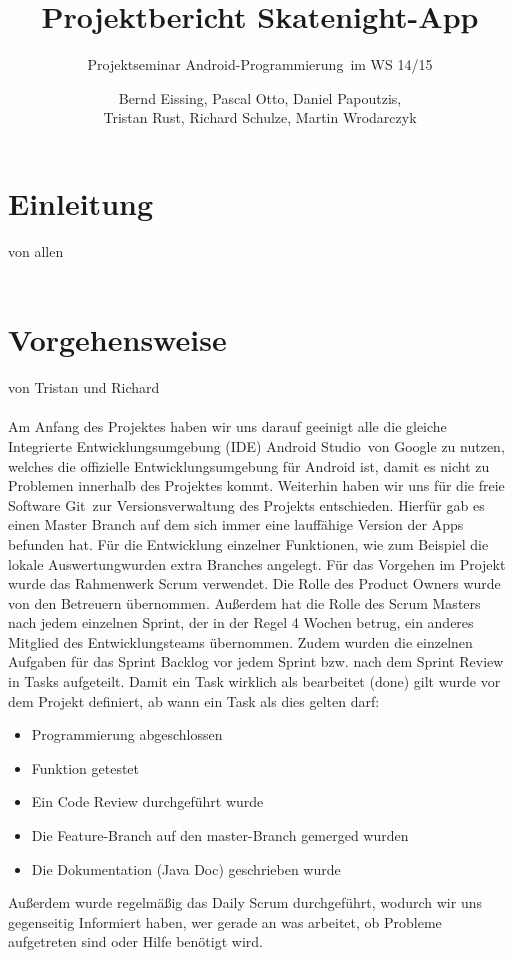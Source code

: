 \documentclass[a4paper, titlepage]{scrartcl}
\title{Projektbericht Skatenight-App}
\subtitle{Projektseminar \glqq Android-Programmierung\grqq\ im WS 14/15}
\author{Bernd Eissing, Pascal Otto, Daniel Papoutzis,\\Tristan Rust, Richard Schulze, Martin Wrodarczyk}
\date{}
\newcommand{\AUTHOR}[1]{
	von #1 \\ \\
}
\begin{document}
\maketitle

\tableofcontents
\newpage

\section{Einleitung}
\AUTHOR{allen}



\section{Vorgehensweise}
\AUTHOR{Tristan und Richard}
Am Anfang des Projektes haben wir uns darauf geeinigt alle die gleiche Integrierte Entwicklungsumgebung (IDE) \glqq Android Studio\grqq\ von Google zu nutzen, welches die offizielle Entwicklungsumgebung für Android ist, damit es nicht zu Problemen innerhalb des Projektes kommt.
Weiterhin haben wir uns für die freie Software \glqq Git\grqq\ zur Versionsverwaltung des Projekts entschieden. Hierfür gab es einen Master Branch auf dem sich immer eine lauffähige Version der Apps befunden hat. Für die Entwicklung einzelner Funktionen, wie zum Beispiel die \glqq lokale Auswertung\grqq wurden extra Branches angelegt.
Für das Vorgehen im Projekt wurde das Rahmenwerk Scrum verwendet. Die Rolle des Product Owners wurde von den Betreuern übernommen. Außerdem hat die Rolle des Scrum Masters nach jedem einzelnen Sprint, der in der Regel 4 Wochen betrug, ein anderes Mitglied des Entwicklungsteams übernommen. Zudem wurden die einzelnen Aufgaben für das Sprint Backlog vor jedem Sprint bzw. nach dem Sprint Review in Tasks aufgeteilt. Damit ein Task wirklich als bearbeitet (\glqq done\grqq) gilt wurde vor dem Projekt definiert, ab wann ein Task als dies gelten darf:

\begin{itemize}
	\item Programmierung abgeschlossen
	\item Funktion getestet
	\item Ein Code Review durchgeführt wurde
	\item Die Feature-Branch auf den master-Branch gemerged wurden
	\item Die Dokumentation (Java Doc) geschrieben wurde
\end{itemize}

Außerdem wurde regelmäßig das Daily Scrum durchgeführt, wodurch wir uns gegenseitig Informiert haben, wer gerade an was arbeitet, ob Probleme aufgetreten sind oder Hilfe benötigt wird.
\end{document}

